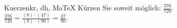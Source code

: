 \begin{MAufgabe}{Kuerzen}{kr, dh, MaTeX}
K\"urzen Sie soweit m\"oglich: $\frac{376}{720}$.\\ 
\ifLsg\MLoesung
\quad $\frac{376}{720}=\frac{(8)\cdot(47)}{(8)\cdot(90)}=\frac{47}{90}$.\else\relax\fi
 \end{MAufgabe}